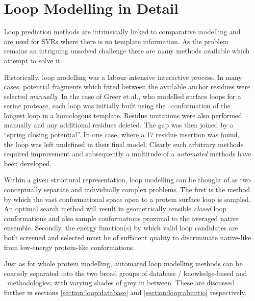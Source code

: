 \section{Loop Modelling in Detail}
\label{section:loopmodelling}

Loop prediction methods are intrinsically linked to comparative modelling and are
used for SVRs where there is no template information. As the problem remains an intriguing unsolved challenge there are many methods available which attempt to solve it. 

Historically, loop modelling was a  labour-intensive interactive process. In many cases, potential fragments  which fitted
between the available anchor residues were selected \emph{manually}\cite{METHOD:FRODO}. In the case of Greer et al.\cite{METHOD:Greer1980}, who modelled
surface loops for a serine protease, each  loop was initially built using the \mainchain\
conformation of the longest
loop in a homologous template. Residue mutations were also performed manually
and any additional residues deleted. The gap was then joined by
a ``spring closing potential''. In one case, where a 17 residue insertion
was found, the loop was left undefined in their final model.  Clearly such arbitrary
methods required improvement and subsequently a multitude of a \emph{automated}
methods have been developed.

Within a given structural representation, loop modelling can be thought of as two conceptually separate and individually complex problems. The first is the method by which the vast conformational space open to a protein surface
loop is sampled. An optimal search
method will result in geometrically sensible \emph{closed} loop conformations and also sample conformations proximal to the averaged native ensemble. Secondly, the energy function(s) by which valid loop candidates are both screened and selected
must be of sufficient quality to discriminate native-like from low-energy
protein-like
conformations. 

Just as for whole protein modelling, automated loop modelling methods can be coarsely separated into the two broad groups of
database / knowledge-based and \abinitio\ methodologies, with varying shades of grey in between. These are discussed further in sections
\ref{section:loop:database} and \ref{section:loop:abinitio} respectively.





 



















